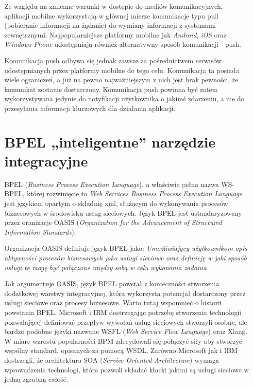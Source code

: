 Ze względu na zmienne warunki w dostępie do mediów komunikacyjnych, aplikacji mobilne wykorzystują w głównej mierze komunikacje typu pull (pobieranie informacji na żądanie) do wymiany informacji z systemami zewnętrznymi. Najpopularniejsze platformy mobilne jak \textit{Android}, \textit{iOS} oraz \textit{Windows Phone} udostępniają również alternatywny sposób komunikacji - push. 

Komunikacja push odbywa się jednak zawsze za pośrednictwem serwisów udostępnianych przez platformy mobilne do tego celu. Komunikacja ta posiada wiele ograniczeń, a już na pewno najważniejszym z nich jest brak pewności, że komunikat zostanie dostarczony. Komunikacja push powinna być zatem wykorzystywana jedynie do notyfikacji użytkownika o jakimś zdarzeniu, a nie do przesyłania informacji kluczowych dla działania aplikacji. 


\section{BPEL „inteligentne” narzędzie integracyjne}
\label{sec:bpel}

BPEL (\textit{Business Process Execution Language}), a właściwie pełna nazwa WS-BPEL,  której rozwinięcie to \textit{Web Services Business Process Execution Language} jest językiem opartym o składnię xml, służącym do wykonywania procesów biznesowych w środowisku usług sieciowych. Język BPEL jest ustandaryzowany przez oranizacje OASIS (\textit{Organization for the Advancement of Structured Information Standards}). 

Organizacja OASIS definiuje język BPEL jako: \textit{Umożliwiający użytkownikom opis aktywności procesów biznesowych jako usługi sieciowe oraz definicję w jaki sposób usługi te mogę być połączone między sobą w celu wykonania zadania}~\cite{OASISweb}.

Jak argumentuje OASIS, język BPEL powstał z konieczności stworzenia dodatkowej warstwy integracyjnej, która wykorzysta potencjał dostarczony przez usługi sieciowe oraz procesy biznesowe. Warto tutaj wspomnieć o historii powstania BPEL. Microsoft i IBM dostrzegając potrzebę stworzenia technologii pozwalającej definiować przepływ wywołań usług sieciowych stworzyli osobne, ale bardzo podobne języki nazwane WSFL (\textit{Web Service Flow Language}) oraz Xlang. W miare wzrostu popularności BPM zdecydowali się połączyć siły aby stworzyć wspólny standard, opisanych za pomocą WSDL. Zarówno Microsoft jak i IBM dostrzegli, że architektura SOA (\textit{Service Oriented Architecture}) wymaga wprowadzenia technologi, która pozwoli składać klocki jakimi są usługi sieciowe w jedną zgrabną całość.

